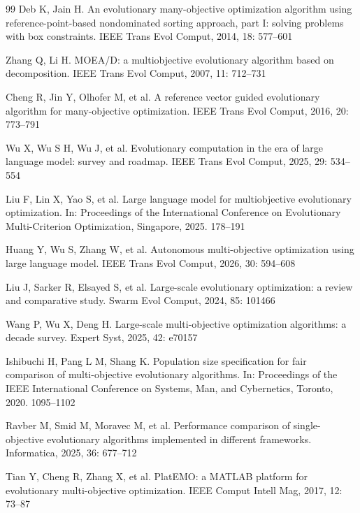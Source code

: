 \documentclass{SCIS2026}
\begin{document}
\begin{thebibliography}{99}
\setlength{\itemsep}{0pt}\setlength{\parsep}{0pt}
 Deb K, Jain H. An evolutionary many-objective optimization algorithm using reference-point-based nondominated sorting approach, part I: solving problems with box constraints. IEEE Trans Evol Comput, 2014, 18: 577--601

 Zhang Q, Li H. MOEA/D: a multiobjective evolutionary algorithm based on decomposition. IEEE Trans Evol Comput, 2007, 11: 712--731

 Cheng R, Jin Y, Olhofer M, et al. A reference vector guided evolutionary algorithm for many-objective optimization. IEEE Trans Evol Comput, 2016, 20: 773--791

 Wu X, Wu S H, Wu J, et al. Evolutionary computation in the era of large language model: survey and roadmap. IEEE Trans Evol Comput, 2025, 29: 534--554

 Liu F, Lin X, Yao S, et al. Large language model for multiobjective evolutionary optimization. In: Proceedings of the International Conference on Evolutionary Multi-Criterion Optimization, Singapore, 2025. 178--191

 Huang Y, Wu S, Zhang W, et al. Autonomous multi-objective optimization using large language model. IEEE Trans Evol Comput, 2026, 30: 594--608

 Liu J, Sarker R, Elsayed S, et al. Large-scale evolutionary optimization: a review and comparative study. Swarm Evol Comput, 2024, 85: 101466

 Wang P, Wu X, Deng H. Large-scale multi-objective optimization algorithms: a decade survey. Expert Syst, 2025, 42: e70157

 Ishibuchi H, Pang L M, Shang K. Population size specification for fair comparison of multi-objective evolutionary algorithms. In: Proceedings of the IEEE International Conference on Systems, Man, and Cybernetics, Toronto, 2020. 1095--1102

 Ravber M, Smid M, Moravec M, et al. Performance comparison of single-objective evolutionary algorithms implemented in different frameworks. Informatica, 2025, 36: 677--712

 Tian Y, Cheng R, Zhang X, et al. PlatEMO: a MATLAB platform for evolutionary multi-objective optimization. IEEE Comput Intell Mag, 2017, 12: 73--87


\end{thebibliography}
\end{document}
